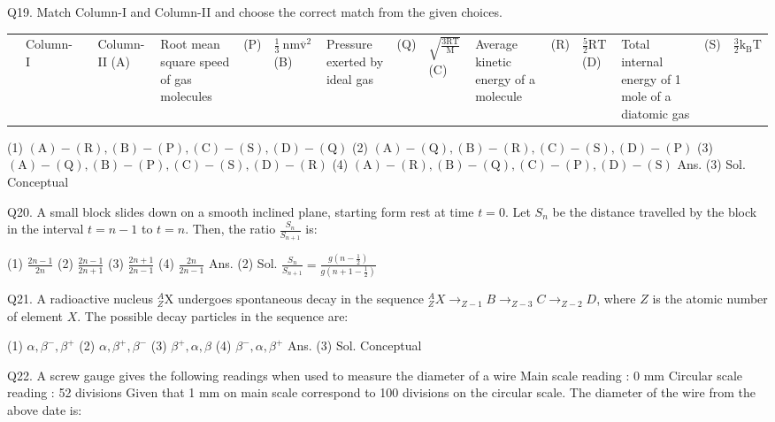 \begin{enumerate}
Q19. Match Column-I and Column-II and choose the correct match from the given choices.

\begin{center}
\begin{tabular}{|l|l|l|l|}
\hline
 & Column-I &  & Column-II 
\hline
(A) & Root mean square speed of gas molecules & (P) & $\frac{1}{3} \mathrm{~nm} \overline{\mathrm{v}}^{2}$ 
\hline
(B) & Pressure exerted by ideal gas & (Q) & $\sqrt{\frac{3 \mathrm{RT}}{\mathrm{M}}}$ 
\hline
(C) & Average kinetic energy of a molecule & (R) & $\frac{5}{2} \mathrm{RT}$ 
\hline
(D) & Total internal energy of 1 mole of a diatomic gas & (S) & $\frac{3}{2} \mathrm{k}_{\mathrm{B}} \mathrm{T}$ 
\hline
\end{tabular}
\end{center}
(1) $(\mathrm{A})-(\mathrm{R}),(\mathrm{B})-(\mathrm{P}),(\mathrm{C})-(\mathrm{S}),(\mathrm{D})-(\mathrm{Q})$
(2) $(\mathrm{A})-(\mathrm{Q}),(\mathrm{B})-(\mathrm{R}),(\mathrm{C})-(\mathrm{S}),(\mathrm{D})-(\mathrm{P})$
(3) $(\mathrm{A})-(\mathrm{Q}),(\mathrm{B})-(\mathrm{P}),(\mathrm{C})-(\mathrm{S}),(\mathrm{D})-(\mathrm{R})$
(4) $(\mathrm{A})-(\mathrm{R}),(\mathrm{B})-(\mathrm{Q}),(\mathrm{C})-(\mathrm{P}),(\mathrm{D})-(\mathrm{S})$
Ans. (3)
Sol. Conceptual

Q20. A small block slides down on a smooth inclined plane, starting form rest at time $t=0$. Let $S_{n}$ be the distance travelled by the block in the interval $t=n-1$ to $t=n$. Then, the ratio $\frac{S_{n}}{S_{n+1}}$ is:

(1) $\frac{2 n-1}{2 n}$
(2) $\frac{2 n-1}{2 n+1}$
(3) $\frac{2 n+1}{2 n-1}$
(4) $\frac{2 n}{2 n-1}$
Ans. (2)
Sol. $\frac{S_{n}}{S_{n+1}}=\frac{g\left(n-\frac{1}{2}\right)}{g\left(n+1-\frac{1}{2}\right)}$

Q21. A radioactive nucleus ${ }_{Z}^{A} \mathrm{X}$ undergoes spontaneous decay in the sequence ${ }_{Z}^{A} X \rightarrow_{Z-1} B \rightarrow_{Z-3} C \rightarrow_{Z-2} D$, where $Z$ is the atomic number of element $X$. The possible decay particles in the sequence are:

(1) $\alpha, \beta^{-}, \beta^{+}$
(2) $\alpha, \beta^{+}, \beta^{-}$
(3) $\beta^{+}, \alpha, \beta$
(4) $\beta^{-}, \alpha, \beta^{+}$
Ans. (3)
Sol. Conceptual

Q22. A screw gauge gives the following readings when used to measure the diameter of a wire Main scale reading : 0 mm
Circular scale reading : 52 divisions
Given that 1 mm on main scale correspond to 100 divisions on the circular scale. The diameter of the wire from the above date is:


\end{enumerate}
